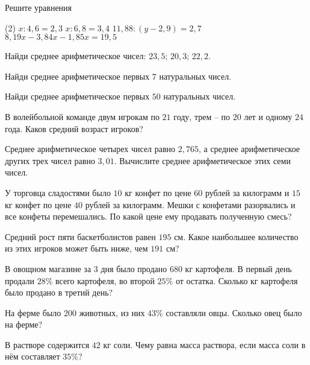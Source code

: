 \begin{class}[number=2]
	\begin{listofex}
		\item Решите уравнения \begin{tasks}(2)
			\task \( x : 4,6 = 2,3 \)
			\task \( x : 6,8 = 3,4 \)
			\task \( 11,88 : (y - 2,9) = 2,7 \)
			\task \( 8,19x - 3,84x - 1,85x = 19,5\)
		\end{tasks}
		\item Найди среднее арифметическое чисел: \( 23,5 \); \( 20,3 \); \( 22,2 \).
		\item Найди среднее арифметическое первых \( 7 \) натуральных чисел.
		\item Найди среднее арифметическое первых \( 50 \) натуральных чисел.
		\item В волейбольной команде двум игрокам по \( 21 \) году, трем – по \( 20 \) лет и одному \( 24 \) года. Каков средний возраст игроков?
		\item Среднее арифметическое четырех чисел равно \( 2,765 \), а среднее арифметическое других трех чисел равно \( 3,01 \). Вычислите среднее арифметическое этих семи чисел.
		\item У торговца сладостями было \( 10 \) кг конфет по цене \( 60 \) рублей за килограмм и \( 15  \) кг конфет по цене \( 40 \) рублей за килограмм. Мешки с конфетами разорвались и все конфеты перемешались. По какой цене ему продавать полученную смесь?
		\item Средний рост пяти баскетболистов равен \( 195 \) см. Какое наибольшее количество из этих игроков может быть ниже, чем \( 191 \) см?
		\item В овощном магазине за \( 3 \) дня было продано \( 680 \) кг картофеля. В первый день продали \( 28\%  \) всего картофеля, во второй \( 25\% \) от остатка. Сколько кг картофеля было продано в третий день?
		\item На ферме было \( 200 \) животных, из них \( 43\% \) составляли овцы. Сколько овец было на ферме? 
		\item В растворе содержится \( 42 \) кг соли. Чему равна масса раствора, если масса соли в нём составляет \( 35\% \)?
	\end{listofex}
\end{class}


